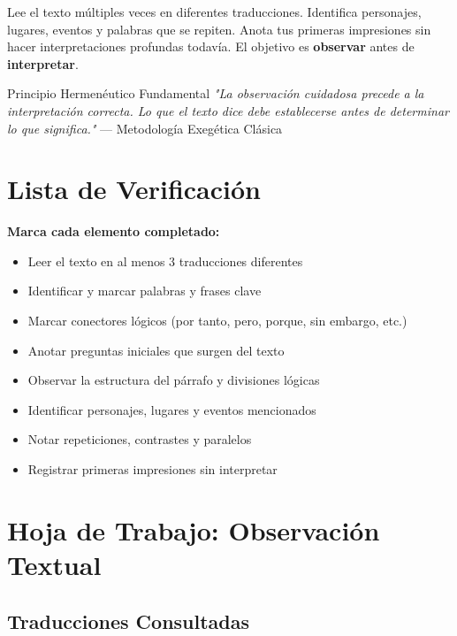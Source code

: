 \documentclass[11pt,a4paper]{article}
\begin{document}
Lee el texto múltiples veces en diferentes traducciones. Identifica personajes, lugares, eventos y palabras que se repiten. Anota tus primeras impresiones sin hacer interpretaciones profundas todavía. El objetivo es \textbf{observar} antes de \textbf{interpretar}.

\begin{infobox}{Principio Hermenéutico Fundamental}
\textit{"La observación cuidadosa precede a la interpretación correcta. Lo que el texto dice debe establecerse antes de determinar lo que significa."} — Metodología Exegética Clásica
\end{infobox}

\section{Lista de Verificación}

\begin{checklistbox}
\textbf{Marca cada elemento completado:}

\begin{itemize}[leftmargin=1cm]
    \item[$\square$] Leer el texto en al menos 3 traducciones diferentes
    \item[$\square$] Identificar y marcar palabras y frases clave
    \item[$\square$] Marcar conectores lógicos (por tanto, pero, porque, sin embargo, etc.)
    \item[$\square$] Anotar preguntas iniciales que surgen del texto
    \item[$\square$] Observar la estructura del párrafo y divisiones lógicas
    \item[$\square$] Identificar personajes, lugares y eventos mencionados
    \item[$\square$] Notar repeticiones, contrastes y paralelos
    \item[$\square$] Registrar primeras impresiones sin interpretar
\end{itemize}
\end{checklistbox}

\newpage

\section{Hoja de Trabajo: Observación Textual}

\subsection{Traducciones Consultadas}
\end{document}
